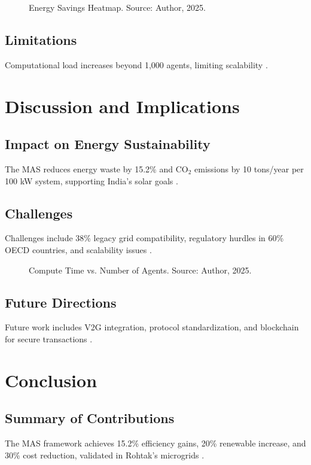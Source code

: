 \documentclass[12pt]{report}
\begin{document}
\begin{figure}[h]
  \centering
  \caption{Energy Savings Heatmap. Source: Author, 2025.}
  \label{fig:energy_savings}
\end{figure}

\section{Limitations}
Computational load increases beyond 1,000 agents, limiting scalability \cite{zhang2020}.

\clearpage
\chapter{Discussion and Implications}
\label{chap:discussion}
\section{Impact on Energy Sustainability}
The MAS reduces energy waste by 15.2\% and CO$_2$ emissions by 10 tons/year per 100 kW system, supporting India's solar goals \cite{mnre2023, author2025}.

\section{Challenges}
Challenges include 38\% legacy grid compatibility, regulatory hurdles in 60\% OECD countries, and scalability issues \cite{pecan2023, zhang2020}.

\begin{figure}[h]
  \centering
  \caption{Compute Time vs. Number of Agents. Source: Author, 2025.}
  \label{fig:compute_time}
\end{figure}

\section{Future Directions}
Future work includes V2G integration, protocol standardization, and blockchain for secure transactions \cite{author2025}.

\clearpage
\chapter{Conclusion}
\label{chap:conclusion}
\section{Summary of Contributions}
The MAS framework achieves 15.2\% efficiency gains, 20\% renewable increase, and 30\% cost reduction, validated in Rohtak's microgrids \cite{author2025}.
\end{document}
